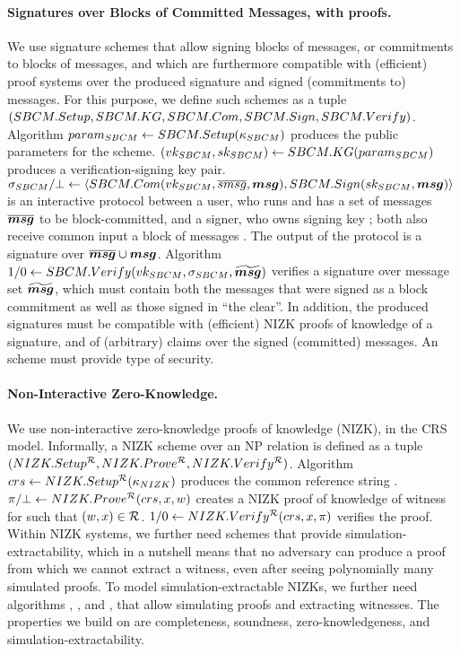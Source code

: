 \paragraph{Signatures over Blocks of Committed Messages, with proofs.} %
We use signature schemes that allow signing blocks of messages, or commitments
to blocks of messages, and which are furthermore compatible with (efficient)
proof systems over the produced signature and signed (commitments to) messages.
For this purpose, we define such schemes as a tuple $(SBCM.Setup,SBCM.KG,
SBCM.Com,SBCM.Sign,SBCM.Verify)$. Algorithm $param_{SBCM} \gets
SBCM.Setup(\kappa_{SBCM})$ produces the public parameters for the scheme.
$(vk_{SBCM},sk_{SBCM}) \gets SBCM.KG(param_{SBCM})$ produces a verification-signing
key pair. $\sigma_{SBCM}/\bot \gets\langle SBCM.Com(vk_{SBCM},\overline{smsg},\boldsymbol{msg}),
SBCM.Sign(sk_{SBCM},\boldsymbol{msg}) \rangle$ is an interactive protocol between a user, who
runs \SBCMCom and has a set of messages $\overline{\boldsymbol{msg}}$ to be block-committed,
and a signer, who owns signing key \SBCMsk; both also receive common input a
block of messages \smsg. The output of the protocol is a signature over
$\overline{\boldsymbol{msg}} \cup \boldsymbol{msg}$. Algorithm $1/0 \gets SBCM.Verify(vk_{SBCM},
\sigma_{SBCM},\widetilde{\boldsymbol{msg}})$ verifies a signature \SBCMsig over message set
$\widetilde{\boldsymbol{msg}}$, which must contain both the messages that were signed as
a block commitment as well as those signed in ``the clear''. In addition, the
produced signatures must be compatible with (efficient) NIZK proofs of knowledge
of a signature, and of (arbitrary) claims over the signed (committed) messages.
An \SBCM scheme must provide  type of security.

\paragraph{Non-Interactive Zero-Knowledge.} %
We use non-interactive zero-knowledge proofs of knowledge (NIZK), in the CRS
model. Informally, a NIZK scheme over an NP relation \NIZKRel is defined as a
tuple $(NIZK.Setup^\mathcal{R},NIZK.Prove^\mathcal{R},NIZK.Verify^\mathcal{R})$.
Algorithm $crs \gets NIZK.Setup^\mathcal{R}(\kappa_{NIZK})$ produces the common
reference string \NIZKcrs. $\pi/\bot \gets NIZK.Prove^\mathcal{R}(crs,
x,w)$ creates a NIZK proof of knowledge of witness \NIZKw for \NIZKx
such that $(w,x) \in \mathcal{R}$. $1/0 \gets NIZK.Verify^\mathcal{R}
(crs,x,\pi)$ verifies the proof. Within NIZK systems, we
further need schemes that provide simulation-extractability, which in a nutshell
means that no adversary can produce a proof from which we cannot extract a
witness, even after seeing polynomially many simulated proofs. To model
simulation-extractable NIZKs, we further need algorithms \NIZKSimSetup,
\NIZKSim, and \NIZKExtract, that allow simulating proofs and extracting
witnesses. The properties we build on are completeness, soundness,
zero-knowledgeness, and simulation-extractability.

